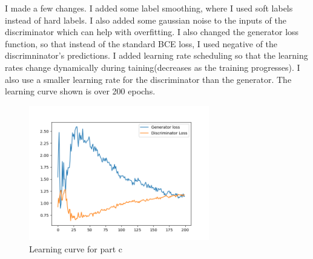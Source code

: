 \documentclass[a4paper]{article}
\theoremstyle{definition}
\newenvironment{soln}{
	\leavevmode\color{blue}\ignorespaces
}{}
\begin{document}
\begin{enumerate} [label=(\alph*)]
		\begin{soln}
			I made a few changes. I added some label smoothing, where I used soft labels instead of hard labels.
			I also added some gaussian noise to the inputs of the discriminator which can help with overfitting.
			I also changed the generator loss function, so that instead of the standard BCE loss, I used negative of the discrimninator's predictions.
			I added learning rate scheduling so that the learning rates change dynamically during taining(decreases as the training progresses).
			I also use a smaller learning rate for the discriminator than the generator. The learning curve shown is over 200 epochs.

			\begin{figure}[H]
				\centering
				\includegraphics[width=0.7\textwidth]{outputs/c.loss.png}
				\caption{Learning curve for part c}
				\label{fig:gan_q1_loss}
			\end{figure}
			

\end{soln}
\end{enumerate}
\end{document}
